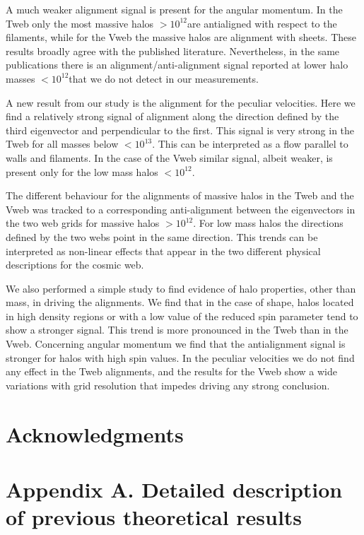 \documentclass[useAMS,usenatbib]{mn2e}
\newcommand{\hMsun}{{\ifmmode{h^{-1}{\rm
        {M_{\odot}}}}\else{$h^{-1}{\rm{M_{\odot}}}$~}\fi}}
\begin{document}
A much weaker alignment signal is present for the angular momentum. In
the Tweb only the most massive halos $>10^{12}$\hMsun are antialigned
with respect to the filaments, while for the Vweb the massive halos
are alignment with sheets. These results broadly agree with the
published literature. Nevertheless, in the same publications there is an
alignment/anti-alignment signal reported at lower halo masses
$<10^{12}$\hMsun that we do not detect in our measurements. 

A new result from our study is the alignment for the peculiar
velocities. Here we find a relatively strong signal of alignment along
the direction defined by the third eigenvector and perpendicular to
the first. This signal is very strong in the Tweb for all masses below
$<10^{13}$\hMsun. This can be interpreted as a flow parallel to walls
and filaments. In the case of the Vweb similar signal, albeit weaker,
is present only for the low mass halos $<10^{12}$\hMsun.

The different behaviour for the alignments of massive halos in the
Tweb and the Vweb was tracked to a corresponding anti-alignment
between the eigenvectors in the two web grids for massive halos
$>10^{12}$\hMsun. For low mass halos the directions defined by the two
webs point in the same direction. This trends can be interpreted as
non-linear effects that appear in the two different physical
descriptions for the cosmic web. 

We also performed a simple study to find evidence of halo properties,
other than mass, in driving the alignments. We find that in the case of
shape, halos located in high density regions or with a low value of
the reduced spin parameter tend to show a stronger signal. This trend is
more pronounced in the Tweb than in the Vweb. Concerning angular
momentum we find that the antialignment signal is stronger for halos
with high spin values. In the peculiar velocities we do not find any
effect in the Tweb alignments, and the results for the Vweb show a
wide variations with grid resolution that impedes driving any strong
conclusion. 


\section*{Acknowledgments} 

\section*{Appendix A. Detailed description of previous theoretical results}
\end{document}
